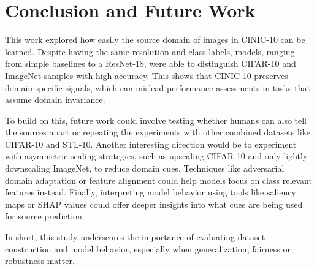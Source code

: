 \section{Conclusion and Future Work}

This work explored how easily the source domain of images in CINIC-10 can be learned. Despite having the same resolution and class labels, 
models, ranging from simple baselines to a ResNet-18, were able to distinguish CIFAR-10 and ImageNet samples with high accuracy. This shows that 
CINIC-10 preserves domain specific signals, which can mislead performance assessments in tasks that assume domain invariance.

To build on this, future work could involve testing whether humans can also tell the sources apart or repeating the experiments with other 
combined datasets like CIFAR-10 and STL-10. Another interesting direction would be to experiment with asymmetric scaling strategies, such as 
upscaling CIFAR-10 and only lightly downscaling ImageNet, to reduce domain cues. Techniques like adversarial domain adaptation or feature alignment 
could help models focus on class relevant features instead. Finally, interpreting model behavior using tools like saliency maps or SHAP values 
could offer deeper insights into what cues are being used for source prediction.

In short, this study underscores the importance of evaluating dataset construction and model behavior, especially when generalization, fairness or 
robustness matter.